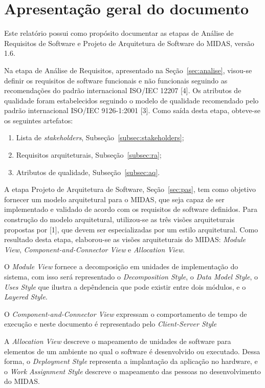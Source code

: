 \documentclass[11pt,a4paper]{article}
\begin{document}

\section{Apresentação geral do documento}

Este relatório possui como propósito documentar as etapas de Análise de Requisitos de  Software e Projeto de Arquitetura de Software do MIDAS, versão 1.6. 

Na etapa de Análise de Requisitos, apresentado na Seção~\ref{sec:analise}, visou-se definir os requisitos de software funcionais e não funcionais seguindo as recomendações do padrão internacional ISO/IEC 12207 [4]. Os atributos de qualidade foram estabelecidos seguindo o modelo de qualidade recomendado pelo padrão internacional ISO/IEC 9126-1:2001 [3]. Como saída desta etapa, obteve-se os seguintes artefatos:

\begin{enumerate}
\item Lista de \textit{stakeholders}, Subseção~\ref{subsec:stakeholders};
\item Requisitos arquiteturais, Subseção~\ref{subsec:ra};
\item Atributos de qualidade, Subseção~\ref{subsec:aq}.
\end{enumerate}

A etapa Projeto de Arquitetura de Software, Seção~\ref{sec:pas}, tem como objetivo fornecer um modelo arquitetural para o MIDAS, que seja capaz de ser implementado e validado de acordo com os requisitos de software definidos.
Para construção do modelo arquitetural, utilizou-se as três visões arquiteturais propostas por [1], que devem ser especializadas por um estilo arquitetural. Como resultado desta etapa, elaborou-se as visões arquiteturais do MIDAS: \textit{Module View}, \textit{Component-and-Connector View} e \textit{Allocation View}.

O \textit{Module View} fornece a decomposição em unidades de implementação do sistema,  com isso será representado o \textit{Decomposition Style}, o \textit{Data Model Style}, o \textit{Uses Style} que ilustra a depêndencia que pode existir entre dois módulos, e o \textit{Layered Style}.

O \textit{Component-and-Connector View} expressam o comportamento de tempo de execução e neste documento é representado pelo \textit{Client-Server Style}

A \textit{Allocation View} descreve o mapeamento de unidades de software para elementos de um ambiente no qual o software é desenvolvido ou executado. Dessa forma, o \textit{Deployment Style} representa a implantação da aplicação no hardware, e o  \textit{Work Assignment Style} descreve o mapeamento das pessoas no desenvolvimento do MIDAS.
\end{document}
